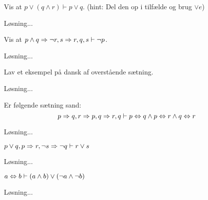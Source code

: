 \begin{opg}
    Vis at $p \lor (q \land r) \vdash p \lor q$.
    (hint: Del den op i tilfælde og brug $\lor e$)
	\begin{solution}
		Løsning...
	\end{solution}
\end{opg}

\begin{opg}
    Vis at $p \land q \Rightarrow \lnot r, s \Rightarrow r, q, s \vdash \lnot p$.
	\begin{solution}
		Løsning...
	\end{solution}
\end{opg}

\begin{opg}
    Lav et eksempel på dansk af overstående sætning.
	\begin{solution}
		Løsning...
	\end{solution}
\end{opg}

\begin{opg}
    Er følgende sætning sand:
    \[ p \Rightarrow q, r \Rightarrow p, q \Rightarrow r, q \vdash p \Leftrightarrow q \land p \Leftrightarrow r \land q \Leftrightarrow r \]
	\begin{solution}
		Løsning...
	\end{solution}
\end{opg}

\begin{opg}
    $p \lor q, p \Rightarrow r, \lnot s \Rightarrow \lnot q \vdash r \lor s$
	\begin{solution}
		Løsning...
	\end{solution}
\end{opg}

\begin{opg}
    $a \Leftrightarrow b \vdash (a \land b) \lor (\lnot a \land \lnot b)$
	\begin{solution}
		Løsning...
	\end{solution}
\end{opg}

\ifdefined\startOpgaverUdsagnslogik\fi
